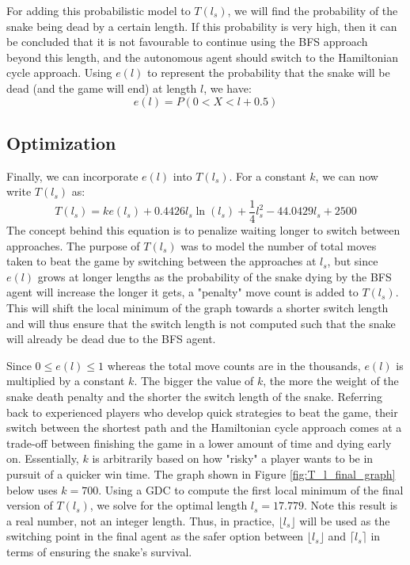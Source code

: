 \documentclass[12pt]{article}
\begin{document}
For adding this probabilistic model to $T(l_s)$, we will find the probability of the snake being dead by a certain length. If this probability is very high, then it can be concluded that it is not favourable to continue using the BFS approach beyond this length, and the autonomous agent should switch to the Hamiltonian cycle approach. Using $e(l)$ to represent the probability that the snake will be dead (and the game will end) at length $l$, we have:
\begin{equation}
e(l) = P(0 < X < l + 0.5)
\end{equation}

\subsection{Optimization}

Finally, we can incorporate $e(l)$ into $T(l_s)$. For a constant $k$, we can now write $T(l_s)$ as:
\begin{equation}
T(l_s) = ke(l_s) + 0.4426l_{s}\ln(l_{s}) + \frac{1}{4}l_{s}^2 - 44.0429l_{s} + 2500
\end{equation}
The concept behind this equation is to penalize waiting longer to switch between approaches. The purpose of $T(l_s)$ was to model the number of total moves taken to beat the game by switching between the approaches at $l_s$, but since $e(l)$ grows at longer lengths as the probability of the snake dying by the BFS agent will increase the longer it gets, a "penalty" move count is added to $T(l_s)$. This will shift the local minimum of the graph towards a shorter switch length and will thus ensure that the switch length is not computed such that the snake will already be dead due to the BFS agent.

Since $0 \leq e(l) \leq 1$ whereas the total move counts are in the thousands, $e(l)$ is multiplied by a constant $k$. The bigger the value of $k$, the more the weight of the snake death penalty and the shorter the switch length of the snake. Referring back to experienced players who develop quick strategies to beat the game, their switch between the shortest path and the Hamiltonian cycle approach comes at a trade-off between finishing the game in a lower amount of time and dying early on. Essentially, $k$ is arbitrarily based on how "risky" a player wants to be in pursuit of a quicker win time. The graph shown in Figure \ref{fig:T_l_final_graph} below uses $k=700$. Using a GDC to compute the first local minimum of the final version of $T(l_s)$, we solve for the optimal length $l_s = 17.779$. Note this result is a real number, not an integer length. Thus, in practice, $\lfloor{l_s}\rfloor$ will be used as the switching point in the final agent as the safer option between $\lfloor{l_s}\rfloor$ and $\lceil{l_s}\rceil$ in terms of ensuring the snake's survival.
\end{document}
